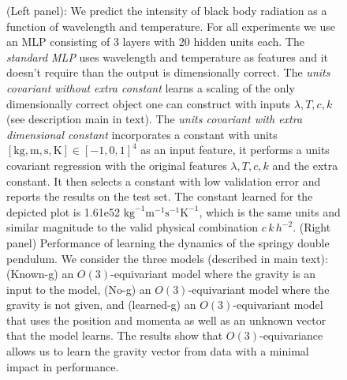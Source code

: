 \documentclass{article}
\theoremstyle{plain}
\theoremstyle{definition}
\theoremstyle{remark}
\newcommand{\unit}[1]{\mathrm{#1}}
\newcommand{\kg}{\unit{kg}}
\newcommand{\m}{\unit{m}}
\newcommand{\s}{\unit{s}}
\newcommand{\K}{\unit{K}}
\begin{document}
\begin{figure}[t!]
\begin{minipage}{0.5\textwidth}
    \end{minipage}
    \caption{(Left panel): We predict the intensity of black body radiation as a function of wavelength and temperature. For all experiments we use an MLP consisting of 3 layers with 20 hidden units each. The \emph{standard MLP} uses wavelength and temperature as features and it doesn't require than the output is dimensionally correct. The \emph{units covariant without extra constant} learns a scaling of the only dimensionally correct object one can construct with inputs $\lambda, T, c, k$ (see description main in text). The \emph{units covariant with extra dimensional constant} incorporates a constant with units $[\kg, \m, \s, \K]\in[-1,0,1]^4$ as an input feature, it performs a units covariant regression with the original features $\lambda, T, c, k$ and the extra constant. It then selects a constant with low validation error and reports the results on the test set. The constant learned for the depicted plot is 1.61e52 $\kg^{-1}\m^{-1}\s^{-1}\K^{-1}$, which is the same units and similar magnitude to the valid physical combination $c\,k\,h^{-2}$.
    (Right panel) Performance of learning the dynamics of the springy double pendulum. We consider the three models (described in main text): (Known-g) an $O(3)$-equivariant model where the gravity is an input to the model, (No-g) an $O(3)$-equivariant model where the gravity is not given, and (learned-g) an $O(3)$-equivariant model that uses the position and momenta as well as an unknown vector that the model learns. The results show that $O(3)$-equivariance allows us to learn the gravity vector from data with a minimal impact in performance.}
    \label{fig:my_label}
    \vspace{-2ex}
\end{figure}
\end{document}

